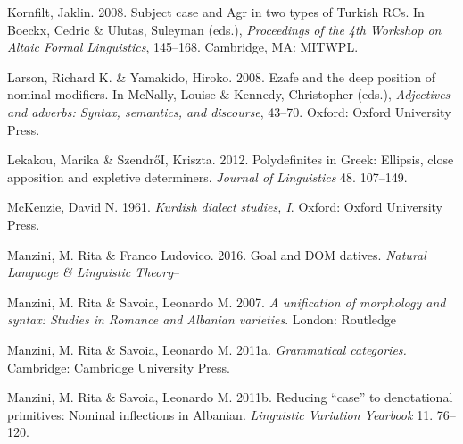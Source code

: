 \documentclass[output=paper]{langsci/langscibook}
\begin{document}
\begin{styleSfondomedioiColorexi}
Kornfilt, Jaklin. 2008. Subject case and Agr in two types of Turkish RCs. In Boeckx, Cedric \& Ulutas, Suleyman (eds.), \textit{Proceedings of the 4th Workshop on Altaic Formal Linguistics}, 145–168. Cambridge, MA: MITWPL. 
\end{styleSfondomedioiColorexi}

\begin{styleSfondomedioiColorexi}
Larson, Richard K. \& Yamakido, Hiroko. 2008. Ezafe and the deep position of nominal modifiers. In McNally, Louise \& Kennedy, Christopher (eds.), \textit{Adjectives and adverbs: Syntax, semantics, and discourse}, 43–70. Oxford: Oxford University Press. 
\end{styleSfondomedioiColorexi}

\begin{styleSfondomedioiColorexi}
Lekakou, Marika \& Szendr\H{o}I, Kriszta. 2012. Polydefinites in Greek: Ellipsis, close apposition and expletive determiners. \textit{Journal of Linguistics} 48. 107–149. 
\end{styleSfondomedioiColorexi}

\begin{styleSfondomedioiColorexxi}
McKenzie, David N. 1961. \textit{Kurdish dialect studies, I}. Oxford: Oxford University Press.
\end{styleSfondomedioiColorexxi}

\begin{styleSfondomedioiColorexi}
Manzini, M. Rita \& Franco Ludovico. 2016. Goal and DOM datives. \textit{Natural Language \& Linguistic Theory}–
\end{styleSfondomedioiColorexi}

\begin{styleSfondomedioiColorexxi}
Manzini, M. Rita \& Savoia, Leonardo M. 2007. \textit{A unification of morphology and syntax: Studies in Romance and Albanian varieties}. London: Routledge 
\end{styleSfondomedioiColorexxi}

\begin{styleSfondomedioiColorexi}
Manzini, M. Rita \& Savoia, Leonardo M. 2011a. \textit{Grammatical categories.} Cambridge: Cambridge University Press.
\end{styleSfondomedioiColorexi}

\begin{styleSfondomedioiColorexi}
Manzini, M. Rita \& Savoia, Leonardo M. 2011b. Reducing “case” to denotational primitives: Nominal inflections in Albanian. \textit{Linguistic Variation Yearbook} 11. 76–120.
\end{styleSfondomedioiColorexi}
\end{document}
